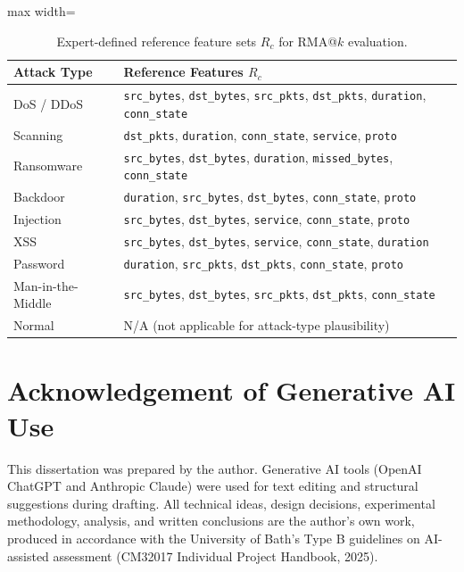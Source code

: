 \documentclass[12pt,a4paper]{report}
\begin{document}
\begin{table}[H]
\centering
\caption{Expert-defined reference feature sets $R_c$ for RMA@$k$ evaluation.}
\label{tab:reference}
\begin{adjustbox}{max width=\textwidth}
\begin{tabular}{lp{8cm}}
\toprule
\textbf{Attack Type} & \textbf{Reference Features $R_c$} \\
\midrule
DoS / DDoS & \texttt{src\_bytes}, \texttt{dst\_bytes}, \texttt{src\_pkts}, \texttt{dst\_pkts}, \texttt{duration}, \texttt{conn\_state} \\
Scanning & \texttt{dst\_pkts}, \texttt{duration}, \texttt{conn\_state}, \texttt{service}, \texttt{proto} \\
Ransomware & \texttt{src\_bytes}, \texttt{dst\_bytes}, \texttt{duration}, \texttt{missed\_bytes}, \texttt{conn\_state} \\
Backdoor & \texttt{duration}, \texttt{src\_bytes}, \texttt{dst\_bytes}, \texttt{conn\_state}, \texttt{proto} \\
Injection & \texttt{src\_bytes}, \texttt{dst\_bytes}, \texttt{service}, \texttt{conn\_state}, \texttt{proto} \\
XSS & \texttt{src\_bytes}, \texttt{dst\_bytes}, \texttt{service}, \texttt{conn\_state}, \texttt{duration} \\
Password & \texttt{duration}, \texttt{src\_pkts}, \texttt{dst\_pkts}, \texttt{conn\_state}, \texttt{proto} \\
Man-in-the-Middle & \texttt{src\_bytes}, \texttt{dst\_bytes}, \texttt{src\_pkts}, \texttt{dst\_pkts}, \texttt{conn\_state} \\
Normal & N/A (not applicable for attack-type plausibility) \\
\bottomrule
\end{tabular}
\end{adjustbox}
\end{table}

\chapter{Acknowledgement of Generative AI Use}
\label{app:ai}

This dissertation was prepared by the author. Generative AI tools (OpenAI ChatGPT and Anthropic Claude) were used for text editing and structural suggestions during drafting. All technical ideas, design decisions, experimental methodology, analysis, and written conclusions are the author's own work, produced in accordance with the University of Bath's Type B guidelines on AI-assisted assessment (CM32017 Individual Project Handbook, 2025).
\end{document}
